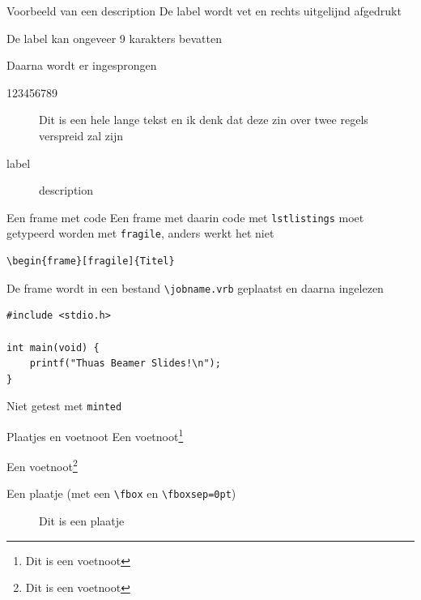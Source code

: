 \documentclass[fleqn,aspectratio=169,dutch]{beamer}
\begin{document}
\begin{frame}{Voorbeeld van een description}
De label wordt vet en rechts uitgelijnd afgedrukt

De label kan ongeveer 9 karakters bevatten

Daarna wordt er ingesprongen
\begin{description}
\item[123456789] Dit is een hele lange tekst en ik denk dat deze zin over twee regels verspreid zal zijn
\item[label] description
\end{description}
\end{frame}

\begin{frame}[fragile]{Een frame met code}
Een frame met daarin code met \texttt{lstlistings} moet getypeerd worden met \texttt{fragile}, anders werkt het niet

\begin{lstlisting}
\begin{frame}[fragile]{Titel}
\end{lstlisting}

De frame wordt in een bestand \lstinline|\jobname.vrb| geplaatst en daarna ingelezen

\begin{lstlisting}
#include <stdio.h>

int main(void) {
    printf("Thuas Beamer Slides!\n");
}
\end{lstlisting}

Niet getest met \lstinline|minted|
\end{frame}

\begin{frame}[fragile]{Plaatjes en voetnoot}
Een voetnoot\footnote{Dit is een voetnoot}

Een voetnoot\footnote{Dit is een voetnoot}

Een plaatje (met een \lstinline|\fbox| en \lstinline|\fboxsep=0pt|)

\begin{figure}[!ht]
\fboxsep=0pt
\caption{Dit is een plaatje}
\end{figure}

\end{frame}
\end{document}
